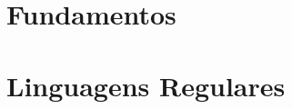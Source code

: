 \documentclass[10pt, a4paper]{book}
\begin{document}
\frontmatter




\tableofcontents

\mainmatter

\part{Fundamentos}


\part{Linguagens Regulares}



{}	%
\end{document}
